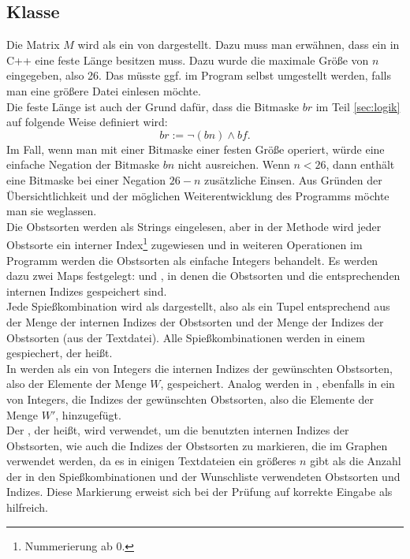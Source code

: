 \subsection{Klasse }
Die Matrix $M$ wird als ein  von  dargestellt.
Dazu muss man erwähnen, dass ein  in C++ eine feste Länge besitzen muss.
Dazu wurde die maximale Größe von $n$ eingegeben, also 26.
Das müsste ggf. im Program selbst umgestellt werden,
falls man eine größere Datei einlesen möchte.\\
Die feste Länge ist auch der Grund dafür, dass die Bitmaske $br$ im Teil \ref{sec:logik}
auf folgende Weise definiert wird:
\[
br := \neg(bn) \land bf.
\]
Im Fall, wenn man mit einer Bitmaske einer festen Größe operiert, würde 
eine einfache Negation der Bitmaske $bn$ nicht ausreichen. Wenn $n < 26$, dann enthält 
eine Bitmaske bei einer Negation $26 - n$ zusätzliche Einsen. Aus Gründen der Übersichtlichkeit 
und der möglichen Weiterentwicklung des Programms möchte man sie weglassen.\\

Die Obstsorten werden als Strings eingelesen, aber in der Methode 
wird jeder Obstsorte ein interner Index\footnote{Nummerierung ab 0.} zugewiesen
und in weiteren Operationen im Programm
werden die Obstsorten als einfache Integers behandelt. 
Es werden dazu zwei Maps festgelegt:  und , 
in denen die Obstsorten und die entsprechenden internen Indizes gespeichert sind.\\

Jede Spießkombination wird als  dargestellt, also als ein Tupel entsprechend
aus der Menge der internen Indizes der Obstsorten und der Menge der Indizes der Obstsorten (aus der Textdatei).
Alle Spießkombinationen werden in einem  gespiechert, der  heißt.\\

In  werden als ein  von Integers die internen Indizes der gewünschten 
Obstsorten, also der Elemente der Menge $W$, gespeichert.
Analog werden in , ebenfalls in ein  von Integers, die Indizes der gewünschten 
Obstsorten, also die Elemente der Menge $W'$, hinzugefügt.\\ 

Der , der  heißt, wird verwendet, um die benutzten internen Indizes der Obstsorten,
wie auch die Indizes der Obstsorten zu markieren, die im Graphen verwendet werden,
da es in einigen Textdateien ein größeres $n$ gibt als die Anzahl der in den Spießkombinationen 
und der Wunschliste verwendeten Obstsorten und Indizes. 
Diese Markierung erweist sich bei der Prüfung auf korrekte Eingabe als hilfreich.\\

